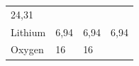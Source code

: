 {{\begin{center}
\begin{xtabular}[t]{|l|l|l|l|}
    
        24,31%
     \tabularnewline{}
    
    
        Lithium &
    
    
        6,94 &
    
    
        6,94 &
    
    
        6,94%
     \tabularnewline{}
    
    
        Oxygen &
    
    
        16 &
    
    
        16 &
    

\end{xtabular}
\end{center}}}
